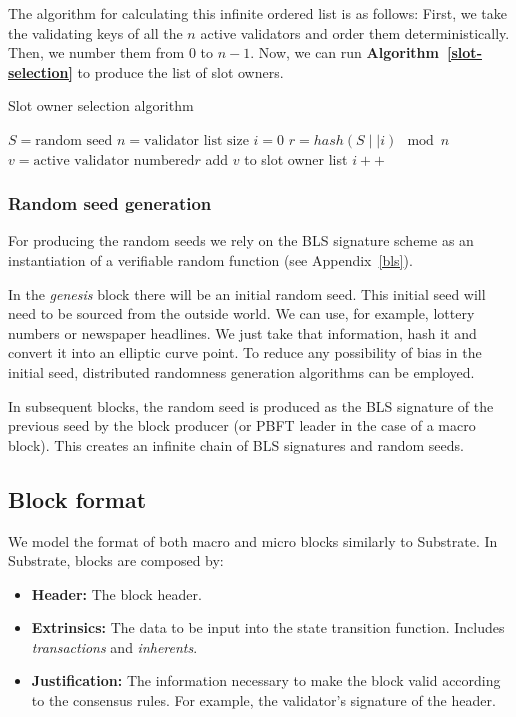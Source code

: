 \documentclass[conference]{IEEEtran}
\begin{document}
The algorithm for calculating this infinite ordered list is as follows:
First, we take the validating keys of all the $n$ active validators and order them deterministically. Then, we number them from $0$ to $n-1$. Now, we can run \textbf{Algorithm~\ref{slot-selection}} to produce the list of slot owners.

\begin{algorithm}
	\caption{Slot owner selection algorithm}
	\label{slot-selection}
	\begin{algorithmic}[0]
		\State $S= \text{random seed}$
		\State $n= \text{validator list size}$
		\State $i=0$
		\Loop
		\State $r= hash(S \mid\mid i) \mod n$
		\State $v= \text{active validator numbered} r$
		\State add $v$ to slot owner list
		\State $i++$
		\EndLoop
	\end{algorithmic}
\end{algorithm}

\subsubsection{Random seed generation}
For producing the random seeds we rely on the BLS signature scheme as an instantiation of a verifiable random function (see Appendix~\ref{bls}).

In the \textit{genesis} block there will be an initial random seed. This initial seed will need to be sourced from the outside world. We can use, for example, lottery numbers \cite{baigneres2015trap} or newspaper headlines. We just take that information, hash it and convert it into an elliptic curve point. To reduce any possibility of bias in the initial seed, distributed randomness generation algorithms can be employed.

In subsequent blocks, the random seed is produced as the BLS signature of the previous seed by the block producer (or PBFT leader in the case of a macro block). This creates an infinite chain of BLS signatures and random seeds.

\subsection{Block format}
We model the format of both macro and micro blocks similarly to Substrate. In Substrate, blocks are composed by:

\begin{itemize}
	\item \textbf{Header:} The block header.
	\item \textbf{Extrinsics:} The data to be input into the state transition function. Includes \textit{transactions} and \textit{inherents}.
	\item \textbf{Justification:} The information necessary to make the block valid according to the consensus rules. For example, the validator's signature of the header.
\end{itemize}
\end{document}

